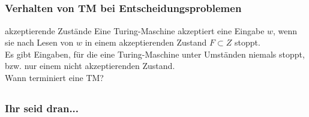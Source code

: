 \subsection*{}
\begin{frame}
  \frametitle{Verhalten von TM bei Entscheidungsproblemen}
\begin{block}{akzeptierende Zustände}
Eine Turing-Maschine akzeptiert eine Eingabe $w$, wenn sie nach Lesen
von $w$ in einem akzeptierenden Zustand $F \subset Z$ stoppt. \\
Es gibt Eingaben, für die eine Turing-Maschine unter Umständen niemals
stoppt, bzw. nur einem nicht akzeptierenden Zustand. \\
Wann terminiert eine TM?
\end{block}
\end{frame}


\subsection*{}
\begin{frame}
	\frametitle{Ihr seid dran...}
\end{frame}


